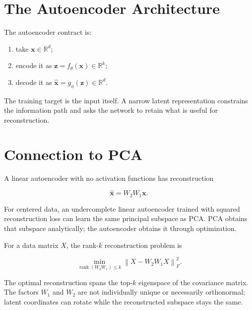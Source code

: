 \documentclass{article}
\begin{document}
\section{The Autoencoder Architecture}

The autoencoder contract is:

\begin{enumerate}
\item take $\mathbf{x}\in\mathbb{R}^{d}$;
\item encode it as $\mathbf{z}=f_{\theta}(\mathbf{x})\in\mathbb{R}^{k}$;
\item decode it as $\hat{\mathbf{x}}=g_{\phi}(\mathbf{z})\in\mathbb{R}^{d}$.
\end{enumerate}

The training target is the input itself. A narrow latent representation constrains the
information path and asks the network to retain what is useful for reconstruction.


\section{Connection to PCA}

A linear autoencoder with no activation functions has reconstruction

\[
\hat{\mathbf{x}}=W_2W_1\mathbf{x}.
\]

For centered data, an undercomplete linear autoencoder trained with squared
reconstruction loss can learn the same principal subspace as PCA. PCA obtains that
subspace analytically; the autoencoder obtains it through optimization.

For a data matrix $X$, the rank-$k$ reconstruction problem is

\[
\min_{\operatorname{rank}(W_2W_1)\leq k}
\left\|X-W_2W_1X\right\|_F^2.
\]

The optimal reconstruction spans the top-$k$ eigenspace of the covariance matrix.
The factors $W_1$ and $W_2$ are not individually unique or necessarily orthonormal;
latent coordinates can rotate while the reconstructed subspace stays the same.
\end{document}

